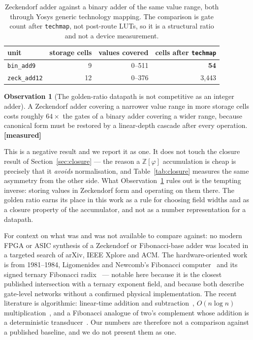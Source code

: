 \documentclass[11pt]{article}
\theoremstyle{definition}
\newtheorem{observation}[theorem]{Observation}
\begin{document}
\begin{table}[t]\centering
\caption{Zeckendorf adder against a binary adder of the same value range, both
through Yosys generic technology mapping. The comparison is gate count after
\texttt{techmap}, not post-route LUTs, so it is a structural ratio and not a
device measurement.}
\label{tab:zeckcost}
\begin{tabular}{lrrr}
\toprule
unit & storage cells & values covered & cells after \texttt{techmap} \\
\midrule
\texttt{bin\_add9}   & 9  & 0--511 & \textbf{54} \\
\texttt{zeck\_add12} & 12 & 0--376 & 3{,}443 \\
\bottomrule
\end{tabular}
\end{table}

\begin{observation}[The golden-ratio datapath is not competitive as an integer adder]
\label{obs:zeckcost}
A Zeckendorf adder covering a narrower value range in more storage cells costs
roughly $64\times$ the gates of a binary adder covering a wider range, because
canonical form must be restored by a linear-depth cascade after every operation.
\textbf{[measured]}
\end{observation}

This is a negative result and we report it as one. It does not touch the closure
result of Section~\ref{sec:closure} --- the reason a $\mathbb{Z}[\varphi]$
accumulation is cheap is precisely that it \emph{avoids} normalisation, and
Table~\ref{tab:closure} measures the same asymmetry from the other side. What
Observation~\ref{obs:zeckcost} rules out is the tempting inverse: storing values
in Zeckendorf form and operating on them there. The golden ratio earns its place
in this work as a rule for choosing field widths and as a closure property of the
accumulator, and not as a number representation for a datapath.

For context on what was and was not available to compare against: no modern
FPGA or ASIC synthesis of a Zeckendorf or Fibonacci-base adder was located in a
targeted search of arXiv, IEEE Xplore and ACM. The hardware-oriented work is from
1981--1984, Ligomenides and Newcomb's Fibonacci
computer~\cite{ligomenides1981complement} and its signed ternary Fibonacci
radix~\cite{ligomenides1984multilevel} --- notable here because it is the
closest published intersection with a ternary exponent field, and because both
describe gate-level networks without a confirmed physical implementation. The
recent literature is algorithmic: linear-time addition and
subtraction~\cite{ahlbach2012efficient}, $O(n\log n)$
multiplication~\cite{idziaszek2021efficient}, and a Fibonacci analogue of
two's complement whose addition is a deterministic
transducer~\cite{labbe2022fibonacci}. Our numbers are therefore not a comparison
against a published baseline, and we do not present them as one.
\end{document}
